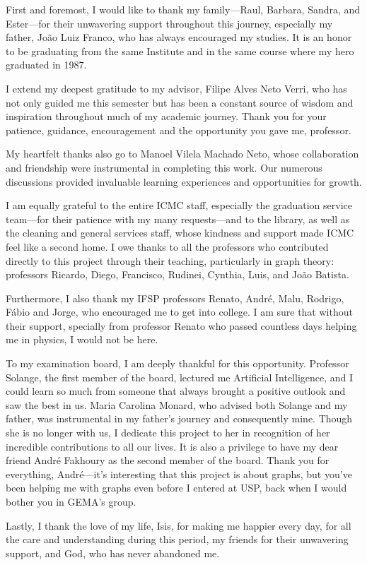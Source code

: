 \begin{agradecimentos}

    First and foremost, I would like to thank my family—Raul, Barbara, Sandra, and Ester—for their unwavering support throughout this journey, especially my father, João Luiz Franco, who has always encouraged my studies. It is an honor to be graduating from the same Institute and in the same course where my hero graduated in 1987.

    I extend my deepest gratitude to my advisor, Filipe Alves Neto Verri, who has not only guided me this semester but has been a constant source of wisdom and inspiration throughout much of my academic journey. Thank you for your patience, guidance, encouragement and the opportunity you gave me, professor.

    My heartfelt thanks also go to Manoel Vilela Machado Neto, whose collaboration and friendship were instrumental in completing this work. Our numerous discussions provided invaluable learning experiences and opportunities for growth.

    I am equally grateful to the entire ICMC staff, especially the graduation service team—for their patience with my many requests—and to the library, as well as the cleaning and general services staff, whose kindness and support made ICMC feel like a second home. I owe thanks to all the professors who contributed directly to this project through their teaching, particularly in graph theory: professors Ricardo, Diego, Francisco, Rudinei, Cynthia, Luis, and João Batista.

    Furthermore, I also thank my IFSP professors Renato, André, Malu, Rodrigo, Fábio and Jorge, who encouraged me to get into college. I am sure that without their support, specially from professor Renato who passed countless days helping me in physics, I would not be here.

    To my examination board, I am deeply thankful for this opportunity. Professor Solange, the first member of the board, lectured me Artificial Intelligence, and I could learn so much from someone that always brought a positive outlook and saw the best in us. Maria Carolina Monard, who advised both Solange and my father, was instrumental in my father's journey and consequently mine. Though she is no longer with us, I dedicate this project to her in recognition of her incredible contributions to all our lives. It is also a privilege to have my dear friend André Fakhoury as the second member of the board. Thank you for everything, André—it's interesting that this project is about graphs, but you've been helping me with graphs even before I entered at USP, back when I would bother you in GEMA's group.

    Lastly, I thank the love of my life, Isis, for making me happier every day, for all the care and understanding during this period, my friends for their unwavering support, and God, who has never abandoned me.

\end{agradecimentos}
